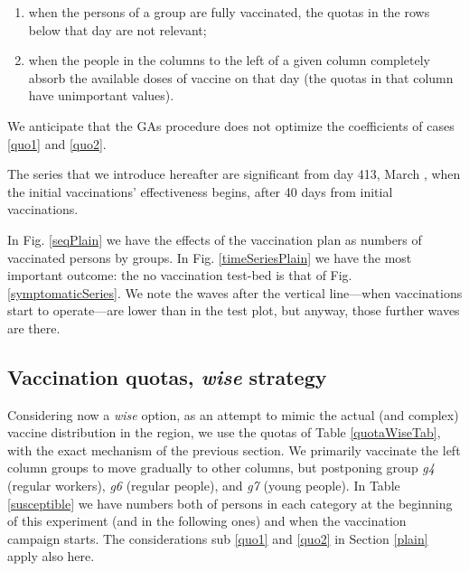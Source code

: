 \documentclass[graybox]{svmult}
\begin{document}
\begin{enumerate}[label=\roman*]
\item \label{quo1} when the persons of a group are fully vaccinated, the quotas in the rows below that day are not relevant;
\item \label{quo2} when the people in the columns to the left of a given column completely absorb the available doses of vaccine on that day (the quotas in that column have unimportant values).
\end{enumerate}

We anticipate that the GAs procedure does not optimize the coefficients of cases \ref{quo1} and \ref{quo2}.

The series that we introduce hereafter are significant from day 413, March , when the initial vaccinations' effectiveness begins, after 40 days from initial vaccinations.

In Fig. \ref{seqPlain} we have the effects of the vaccination plan as numbers of vaccinated persons by groups. In Fig. \ref{timeSeriesPlain} we have the most important outcome: the no vaccination test-bed is that of Fig. \ref{symptomaticSeries}. We note the waves after the vertical line---when vaccinations start to operate---are lower than in the test plot, but anyway, those further waves are there.


\subsection{Vaccination quotas, \emph{wise} strategy}
\label{wise}

Considering now a \emph{wise} option, as an attempt to mimic the actual (and complex) vaccine distribution in the region, we use the quotas of Table \ref{quotaWiseTab}, with the exact mechanism of the previous section.
We primarily vaccinate the left column groups to move gradually to other columns, but postponing group \emph{g4} (regular workers), \emph{g6} (regular people), and \emph{g7} (young people). In Table \ref{susceptible} we have numbers both of persons in each category at the beginning of this experiment (and in the following ones) and when the vaccination campaign starts. The considerations sub \ref{quo1} and \ref{quo2} in Section \ref{plain} apply also here.
\end{document}
